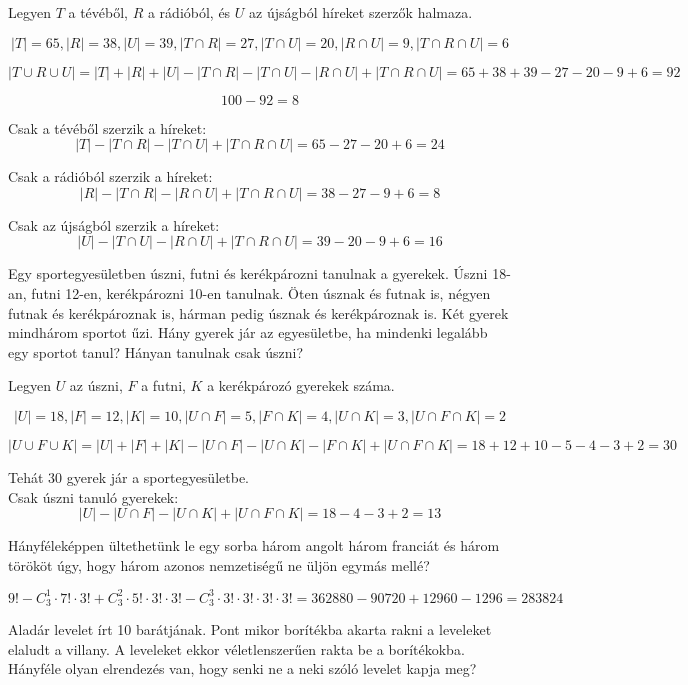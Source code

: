 \begin{solution}
Legyen $T$ a tévéből, $R$ a rádióból, és $U$ az újságból híreket
szerzők halmaza.

\[
|T|=65,|R|=38,|U|=39,|T\cap R|=27,|T\cap U|=20,|R\cap U|=9,|T\cap R\cap U|=6
\]

\[
|T\cup R\cup U|=|T|+|R|+|U|-|T\cap R|-|T\cap U|-|R\cap U|+|T\cap R\cap U|=65+38+39-27-20-9+6=92
\]

\[
100-92=8
\]

Csak a tévéből szerzik a híreket: 
\[
|T|-|T\cap R|-|T\cap U|+|T\cap R\cap U|=65-27-20+6=24
\]

Csak a rádióból szerzik a híreket: 
\[
|R|-|T\cap R|-|R\cap U|+|T\cap R\cap U|=38-27-9+6=8
\]

Csak az újságból szerzik a híreket: 
\[
|U|-|T\cap U|-|R\cap U|+|T\cap R\cap U|=39-20-9+6=16
\]
\end{solution}
\begin{problem}
Egy sportegyesületben úszni, futni és kerékpározni tanulnak a gyerekek.
Úszni 18-an, futni 12-en, kerékpározni 10-en tanulnak. Öten úsznak
és futnak is, négyen futnak és kerékpároznak is, hárman pedig úsznak
és kerékpároznak is. Két gyerek mindhárom sportot űzi. Hány gyerek
jár az egyesületbe, ha mindenki legalább egy sportot tanul? Hányan
tanulnak csak úszni? 
\end{problem}

\begin{solution}
Legyen $U$ az úszni, $F$ a futni, $K$ a kerékpározó gyerekek száma.

\[
|U|=18,|F|=12,|K|=10,|U\cap F|=5,|F\cap K|=4,|U\cap K|=3,|U\cap F\cap K|=2
\]

\[
|U\cup F\cup K|=|U|+|F|+|K|-|U\cap F|-|U\cap K|-|F\cap K|+|U\cap F\cap K|=18+12+10-5-4-3+2=30
\]

Tehát $30$ gyerek jár a sportegyesületbe.\\

Csak úszni tanuló gyerekek: 
\[
|U|-|U\cap F|-|U\cap K|+|U\cap F\cap K|=18-4-3+2=13
\]
\end{solution}
\begin{problem}
Hányféleképpen ültethetünk le egy sorba három angolt három franciát
és három törököt úgy, hogy három azonos nemzetiségű ne üljön egymás
mellé?
\end{problem}

\begin{solution}
\[
9!-C_{3}^{1}\cdot7!\cdot3!+C_{3}^{2}\cdot5!\cdot3!\cdot3!-C_{3}^{3}\cdot3!\cdot3!\cdot3!\cdot3!=362880-90720+12960-1296=283824
\]
\end{solution}
\begin{problem}
Aladár levelet írt 10 barátjának. Pont mikor borítékba akarta rakni
a leveleket elaludt a villany. A leveleket ekkor véletlenszerűen rakta
be a borítékokba. Hányféle olyan elrendezés van, hogy senki ne a neki
szóló levelet kapja meg?\\
 
\end{problem}

